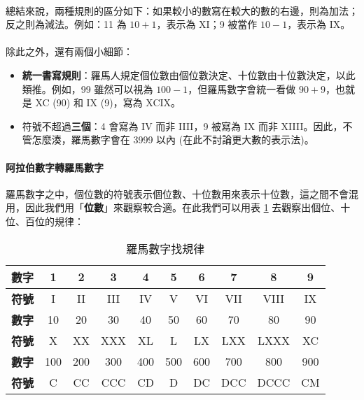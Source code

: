 \documentclass[12pt,a4paper,oneside]{article}
\begin{document}
\begin{CJK}{UTF8}{bkai}
\paragraph{}總結來說，兩種規則的區分如下：如果較小的數寫在較大的數的右邊，則為加法；反之則為減法。例如：11 為 $10+1$，表示為 XI；9 被當作 $10-1$，表示為 IX。
\paragraph{}除此之外，還有兩個小細節：

\begin{itemize}
\item \textbf{統一書寫規則}：羅馬人規定個位數由個位數決定、十位數由十位數決定，以此類推。例如，99 雖然可以視為 $100-1$，但羅馬數字會統一看做 $90+9$，也就是 XC (90) 和 IX (9)，寫為 XCIX。
\item 符號不超過\textbf{三個}：4 會寫為 IV 而非 IIII，9 被寫為 IX 而非 XIIII。因此，不管怎麼湊，羅馬數字會在 3999 以內 (在此不討論更大數的表示法)。
\end{itemize}

\paragraph{阿拉伯數字轉羅馬數字}羅馬數字之中，個位數的符號表示個位數、十位數用來表示十位數，這之間不會混用，因此我們用「{\color{red}\textbf{位數}}」來觀察較合適。在此我們可以用表 \ref{string:mani:table:roman:number:regular} 去觀察出個位、十位、百位的規律：

\begin{table}[h!]
  \centering
  \begin{tabular}{|c||c|c|c|c|c|c|c|c|c|}
  \hline
  \textbf{數字} & 1 & 2 & 3 & 4 & 5 & 6 & 7 & 8 & 9\\
  \hline
  \textbf{符號} & I & II & III & IV & V & VI & VII & VIII & IX\\
  \hline
  \hline
  \textbf{數字} & 10 & 20 & 30 & 40 & 50 & 60 & 70 & 80 & 90\\
  \hline
  \textbf{符號} & X & XX & XXX & XL & L & LX & LXX & LXXX & XC\\
  \hline
  \hline
  \textbf{數字} & 100 & 200 & 300 & 400 & 500 & 600 & 700 & 800 & 900\\
  \hline
  \textbf{符號} & C & CC & CCC & CD & D & DC & DCC & DCCC & CM\\
  \hline
  \end{tabular}
  \caption{羅馬數字找規律}
  \label{string:mani:table:roman:number:regular}
\end{table}


\end{CJK}
\end{document}
